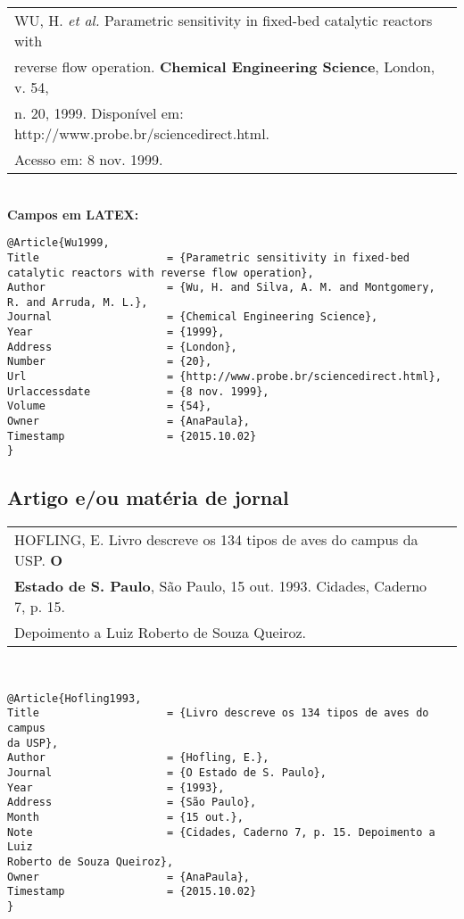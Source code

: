 \begin{tabular}{|l|c|} \hline
	WU, H. \textit{et al.} Parametric sensitivity in fixed-bed catalytic reactors with \\
	reverse flow operation. \textbf{Chemical Engineering Science}, London, v. 54,\\
	n. 20, 1999. Disponível em: http://www.probe.br/sciencedirect.html. \\Acesso em: 8 nov. 1999. \\\hline
\end{tabular} \\

\textbf{Campos em LATEX:} 

\begin{verbatim}
@Article{Wu1999,
Title                    = {Parametric sensitivity in fixed-bed 
catalytic reactors with reverse flow operation},
Author                   = {Wu, H. and Silva, A. M. and Montgomery, 
R. and Arruda, M. L.},
Journal                  = {Chemical Engineering Science},
Year                     = {1999},
Address                  = {London},
Number                   = {20},
Url                      = {http://www.probe.br/sciencedirect.html},
Urlaccessdate            = {8 nov. 1999},
Volume                   = {54},
Owner                    = {AnaPaula},
Timestamp                = {2015.10.02}
}
\end{verbatim}


\subsection{Artigo e/ou mat\'eria de jornal}

\begin{tabular}{|l|c|} \hline
	HOFLING, E. Livro descreve os 134 tipos de aves do campus da USP. \textbf{O} \\ \textbf{Estado de S. Paulo}, São Paulo, 15 out. 1993. Cidades, Caderno 7, p. 15. \\Depoimento a Luiz Roberto de Souza Queiroz.	\\\hline
\end{tabular} \\

\begin{verbatim}
@Article{Hofling1993,
Title                    = {Livro descreve os 134 tipos de aves do campus
da USP},
Author                   = {Hofling, E.},
Journal                  = {O Estado de S. Paulo},
Year                     = {1993},
Address                  = {São Paulo},
Month                    = {15 out.},
Note                     = {Cidades, Caderno 7, p. 15. Depoimento a Luiz 
Roberto de Souza Queiroz},
Owner                    = {AnaPaula},
Timestamp                = {2015.10.02}
}
\end{verbatim}

